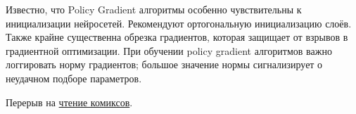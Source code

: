 \begin{remark}
Известно, что Policy Gradient алгоритмы особенно чувствительны к инициализации нейросетей. Рекомендуют ортогональную инициализацию слоёв. Также крайне существенна обрезка градиентов, которая защищает от взрывов в градиентной оптимизации. При обучении policy gradient алгоритмов важно логгировать норму градиентов; большое значение нормы сигнализирует о неудачном подборе параметров.
\end{remark}

\begin{example}
Перерыв на \href{https://hackernoon.com/intuitive-rl-intro-to-advantage-actor-critic-a2c-4ff545978752}{чтение комиксов}.
\end{example}

